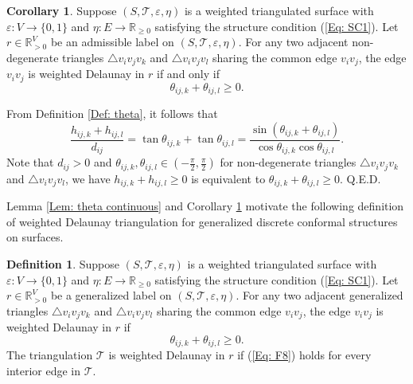 \documentclass[12pt]{amsart}
\theoremstyle{definition}
\newtheorem{corollary}[theorem]{Corollary}
\newtheorem{definition}[theorem]{Definition}
\def\qed{\hfill{Q.E.D.}\smallskip}
\begin{document}
\begin{corollary}\label{Cor: weighted Delaunay 2}
Suppose $(S,\mathcal{T},\varepsilon,\eta)$ is a weighted triangulated surface with $\varepsilon: V\rightarrow \{0,1\}$ and $\eta: E\rightarrow \mathbb{R}_{\geq 0}$ satisfying the structure condition (\ref{Eq: SC1}).
Let $r\in \mathbb{R}^V_{>0}$ be an admissible label on $(S,\mathcal{T},\varepsilon,\eta)$.
For any two adjacent non-degenerate triangles $\triangle v_iv_jv_k$ and $\triangle v_iv_jv_l$ sharing the common edge $v_iv_j$,
the edge $v_iv_j$ is weighted Delaunay in $r$ if and only if
\begin{equation*}
\theta_{ij,k}+\theta_{ij,l}\ge0.
\end{equation*}
\end{corollary}
\proof
From Definition \ref{Def: theta}, it follows that
\begin{equation*}
\frac{h_{ij,k}+h_{ij,l}}{d_{ij}}
=\tan\theta_{ij,k}+\tan\theta_{ij,l}
=\frac{\sin(\theta_{ij,k}+\theta_{ij,l})}
{\cos\theta_{ij,k}\cos\theta_{ij,l}}.
\end{equation*}
Note that $d_{ij}>0$ and $\theta_{ij,k}, \theta_{ij,l}\in (-\frac{\pi}{2},\frac{\pi}{2})$ for non-degenerate triangles $\triangle v_iv_jv_k$ and $\triangle v_iv_jv_l$,
we have $h_{ij,k}+h_{ij,l}\ge0$ is equivalent to $\theta_{ij,k}+\theta_{ij,l}\ge0$.
\qed

Lemma \ref{Lem: theta continuous} and Corollary \ref{Cor: weighted Delaunay 2} motivate the following definition of weighted Delaunay triangulation for
generalized discrete conformal structures on surfaces.

\begin{definition}\label{Def: weighted Delaunay-G}
Suppose $(S,\mathcal{T},\varepsilon,\eta)$ is a weighted triangulated surface with $\varepsilon: V\rightarrow \{0,1\}$ and $\eta: E\rightarrow \mathbb{R}_{\geq 0}$ satisfying the structure condition (\ref{Eq: SC1}).
Let $r\in \mathbb{R}^V_{>0}$ be a generalized label on $(S,\mathcal{T},\varepsilon,\eta)$.
For any two adjacent generalized triangles $\triangle v_iv_jv_k$ and $\triangle v_iv_jv_l$ sharing the common edge $v_iv_j$,
the edge $v_iv_j$ is weighted Delaunay in $r$ if
\begin{equation}\label{Eq: F8}
\theta_{ij,k}+\theta_{ij,l}\ge0.
\end{equation}
The triangulation $\mathcal{T}$ is weighted Delaunay in $r$ if (\ref{Eq: F8}) holds for every interior edge in $\mathcal{T}$.
\end{definition}
\end{document}
